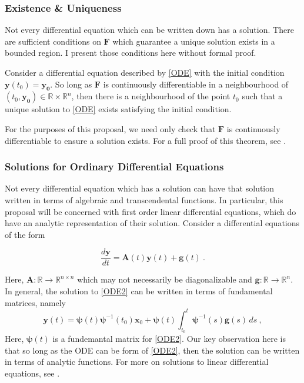 \subsubsection{Existence \& Uniqueness}

Not every differential equation which can be written down has a solution. There are sufficient conditions on $\mathbf{F}$ which guarantee a unique solution exists in a bounded region.  I present those conditions here without formal proof.

Consider a differential equation described by \cref{ODE} with the initial condition  $ \mathbf{y}(t_0) = \mathbf{y_0} $. So long as $\mathbf{F}$ is continuously differentiable in a neighbourhood of $ (t_0, \mathbf{y_0}) \in \mathbb{R}\times\mathbb{R}^n $, then there is a neighbourhood of the point $ t_0 $ such that a unique solution to \cref{ODE} exists satisfying the initial condition.

For the purposes of this proposal, we need only check that $ \mathbf{F} $ is continuously differentiable to ensure a solution exists.  For a full proof of this theorem, see \cite{miller1982ordinary,morris1963ordinary}.

\subsubsection{Solutions for Ordinary Differential Equations}

Not every differential equation which has a solution can have that solution written in terms of algebraic and transcendental functions.  In particular, this proposal will be concerned with first order linear differential equations, which do have an analytic representation of their solution.  Consider a differential equations of the form

\begin{equation}\label{ODE2}
\dfrac{d\mathbf{y}}{dt} = \mathbf{A}(t)\mathbf{y}(t) + \mathbf{g}(t) \>.
\end{equation}

Here, $ \mathbf{A}: \mathbb{R} \rightarrow \mathbb{R}^{n \times n} $ which may not necessarily be diagonalizable and $ \mathbf{g}:  \mathbb{R} \rightarrow \mathbb{R}^n $.  In general, the solution to \cref{ODE2} can be written in terms of fundamental matrices, namely
%
\begin{equation}\label{ODE2_solution}
\mathbf{y}(t) = \bm{\psi}(t)\bm{\psi}^{-1}(t_0)\mathbf{x}_0 + \bm{\psi}(t)\int_{t_0}^{t}\bm{\psi}^{-1}(s) \mathbf{g}(s) \, ds \>,
\end{equation}
%
Here, $ \bm{\psi}(t) $ is a fundemantal matrix for \cref{ODE2}. Our key observation here is that so long as the ODE can be form of \cref{ODE2}, then the solution can be written in terms of analytic functions.  For more on solutions to linear differential equations, see \cite{boyce2012differential}.
